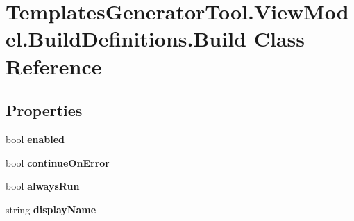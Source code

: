 \hypertarget{class_templates_generator_tool_1_1_view_model_1_1_build_definitions_1_1_build}{}\section{Templates\+Generator\+Tool.\+View\+Model.\+Build\+Definitions.\+Build Class Reference}
\label{class_templates_generator_tool_1_1_view_model_1_1_build_definitions_1_1_build}
\subsection*{Properties}
\begin{DoxyCompactItemize}
\item 
\mbox{\label{class_templates_generator_tool_1_1_view_model_1_1_build_definitions_1_1_build_a4096c37e687c8dd1a97625c616636a64}} 
bool {\bfseries enabled}
\item 
\mbox{\label{class_templates_generator_tool_1_1_view_model_1_1_build_definitions_1_1_build_a39dc1c4bf357a498f4ceac7f31c19ffd}} 
bool {\bfseries continue\+On\+Error}
\item 
\mbox{\label{class_templates_generator_tool_1_1_view_model_1_1_build_definitions_1_1_build_a8795f099e2cde3f31285f58f7a2d05c5}} 
bool {\bfseries always\+Run}
\item 
\mbox{\label{class_templates_generator_tool_1_1_view_model_1_1_build_definitions_1_1_build_a182cb370cb4aced4635798ab6c16e7c8}} 
string {\bfseries display\+Name}
\item 
\mbox{\label{class_templates_generator_tool_1_1_view_model_1_1_build_definitions_1_1_build_a2b9132fec6e7811a9331474c09ae694f}} 

\end{DoxyCompactItemize}
